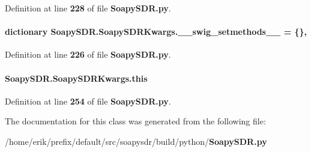 Definition at line {\bf 228} of file {\bf Soapy\+S\+D\+R.\+py}.

\paragraph[{\+\_\+\+\_\+swig\+\_\+setmethods\+\_\+\+\_\+}]{\setlength{\rightskip}{0pt plus 5cm}dictionary Soapy\+S\+D\+R.\+Soapy\+S\+D\+R\+Kwargs.\+\_\+\+\_\+swig\+\_\+setmethods\+\_\+\+\_\+ = \{\}\hspace{0.3cm}{\ttfamily [static]}, {\ttfamily [private]}}\label{classSoapySDR_1_1SoapySDRKwargs_af651c5b93a63529b13b8c60304be87fc}


Definition at line {\bf 226} of file {\bf Soapy\+S\+D\+R.\+py}.

\paragraph[{this}]{\setlength{\rightskip}{0pt plus 5cm}Soapy\+S\+D\+R.\+Soapy\+S\+D\+R\+Kwargs.\+this}\label{classSoapySDR_1_1SoapySDRKwargs_a770b6adddcf19e102359971afe1c4e91}


Definition at line {\bf 254} of file {\bf Soapy\+S\+D\+R.\+py}.



The documentation for this class was generated from the following file\+:\begin{DoxyCompactItemize}
\item 
/home/erik/prefix/default/src/soapysdr/build/python/{\bf Soapy\+S\+D\+R.\+py}\end{DoxyCompactItemize}
